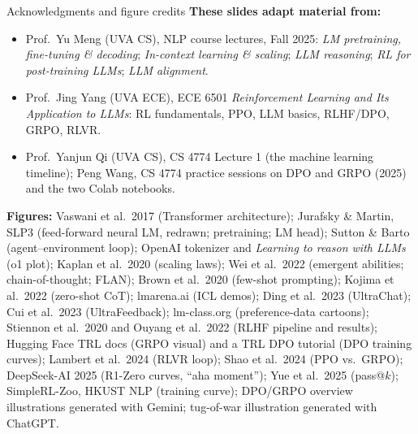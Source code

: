 \begin{frame}{Acknowledgments and figure credits}
\small
\textbf{These slides adapt material from:}
\begin{itemize}\setlength{\itemsep}{2pt}
  \item Prof.\ Yu Meng (UVA CS), NLP course lectures, Fall 2025: \emph{LM pretraining, fine-tuning \& decoding}; \emph{In-context learning \& scaling}; \emph{LLM reasoning}; \emph{RL for post-training LLMs}; \emph{LLM alignment}.
  \item Prof.\ Jing Yang (UVA ECE), ECE 6501 \emph{Reinforcement Learning and Its Application to LLMs}: RL fundamentals, PPO, LLM basics, RLHF/DPO, GRPO, RLVR.
  \item Prof.\ Yanjun Qi (UVA CS), CS 4774 Lecture 1 (the machine learning timeline); Peng Wang, CS 4774 practice sessions on DPO and GRPO (2025) and the two Colab notebooks.
\end{itemize}
\vspace{2pt}
\textbf{Figures:} Vaswani et al.\ 2017 (Transformer architecture); Jurafsky \& Martin, SLP3 (feed-forward neural LM, redrawn; pretraining; LM head); Sutton \& Barto (agent--environment loop); OpenAI tokenizer and \emph{Learning to reason with LLMs} (o1 plot); Kaplan et al.\ 2020 (scaling laws); Wei et al.\ 2022 (emergent abilities; chain-of-thought; FLAN); Brown et al.\ 2020 (few-shot prompting); Kojima et al.\ 2022 (zero-shot CoT); lmarena.ai (ICL demos); Ding et al.\ 2023 (UltraChat); Cui et al.\ 2023 (UltraFeedback); lm-class.org (preference-data cartoons); Stiennon et al.\ 2020 and Ouyang et al.\ 2022 (RLHF pipeline and results); Hugging Face TRL docs (GRPO visual) and a TRL DPO tutorial (DPO training curves); Lambert et al.\ 2024 (RLVR loop); Shao et al.\ 2024 (PPO vs.\ GRPO); DeepSeek-AI 2025 (R1-Zero curves, ``aha moment''); Yue et al.\ 2025 (pass@$k$); SimpleRL-Zoo, HKUST NLP (training curve); DPO/GRPO overview illustrations generated with Gemini; tug-of-war illustration generated with ChatGPT.
\end{frame}

